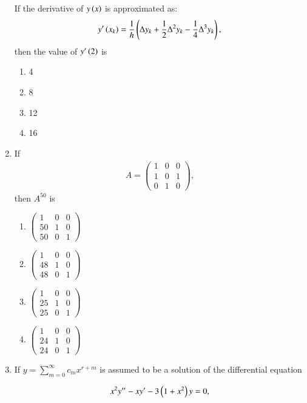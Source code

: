 \documentclass[journal]{IEEEtran}
\begin{document}
\begin{enumerate}
If the derivative of $y \left(x\right)$ is approximated as:
\begin{align}
y^\prime \left(x_k\right) = \frac{1}{h} \left( \Delta y_k + \frac{1}{2} \Delta^2 y_k - \frac{1}{4} \Delta^3 y_k \right),
\end{align}
then the value of $y^\prime \left(2\right)$ is

\begin{enumerate}
    \item 4
    \item 8
    \item 12
    \item 16
\end{enumerate}

\item If 
\begin{align}
A = \begin{pmatrix}
1 & 0 & 0 \\
1 & 0 & 1 \\
0 & 1 & 0
\end{pmatrix},
\end{align}
then $A^{50}$ is

\begin{enumerate}
    \item $\begin{pmatrix} 1 & 0 & 0 \\ 50 & 1 & 0 \\ 50 & 0 & 1 \end{pmatrix}$
    \item $\begin{pmatrix} 1 & 0 & 0 \\ 48 & 1 & 0 \\ 48 & 0 & 1 \end{pmatrix}$
    \item $\begin{pmatrix} 1 & 0 & 0 \\ 25 & 1 & 0 \\ 25 & 0 & 1 \end{pmatrix}$
    \item $\begin{pmatrix} 1 & 0 & 0 \\ 24 & 1 & 0 \\ 24 & 0 & 1 \end{pmatrix}$
\end{enumerate}
\item If $y = \sum_{m=0}^{\infty} c_m x^{r+m}$ is assumed to be a solution of the differential equation

	\begin{align}
		x^2 y^{\prime \prime} - xy^{\prime} - 3 \left(1 + x^2\right) y = 0,
	\end{align}


\end{enumerate}
\end{document}

